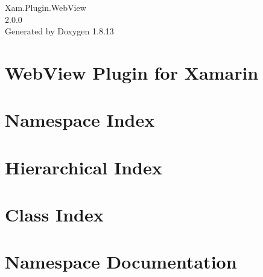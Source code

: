 \documentclass[twoside]{book}
\newcommand{\+}{\discretionary{\mbox{\scriptsize$\hookleftarrow$}}{}{}}
\newcommand{\clearemptydoublepage}{%
  \newpage{\pagestyle{empty}\cleardoublepage}%
}
\begin{document}
\hypersetup{pageanchor=false,
             bookmarksnumbered=true,
             pdfencoding=unicode
            }
\begin{titlepage}
\vspace*{7cm}
\begin{center}%
{\Large Xam.\+Plugin.\+Web\+View \\[1ex]\large 2.\+0.\+0 }\\
\vspace*{1cm}
{\large Generated by Doxygen 1.8.13}\\
\end{center}
\end{titlepage}
\clearemptydoublepage
{}
\tableofcontents
\clearemptydoublepage
{}
\hypersetup{pageanchor=true}

\chapter{Web\+View Plugin for Xamarin}
\label{md__r_e_a_d_m_e}

\chapter{Namespace Index}

\chapter{Hierarchical Index}

\chapter{Class Index}

\chapter{Namespace Documentation}


















\end{document}
